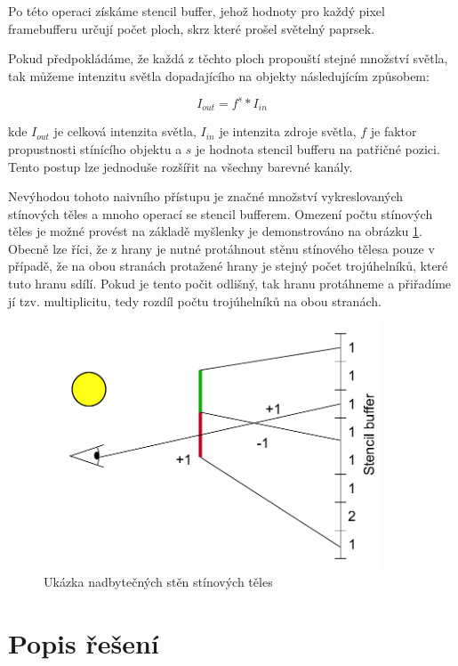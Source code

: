 \documentclass[a4paper, 12pt]{article}
\begin{document}
Po této operaci získáme stencil buffer, jehož hodnoty pro každý pixel framebufferu určují počet ploch, skrz které prošel světelný paprsek.

Pokud předpokládáme, že každá z těchto ploch propouští stejné množství světla, tak můžeme intenzitu světla dopadajícího na objekty následujícím způsobem:

\begin{equation}
	I_{out} = f^s * I_{in}
\end{equation} 

kde $I_{out}$ je celková intenzita světla, $I_{in}$ je intenzita zdroje světla, $f$ je faktor propustnosti stínícího objektu a $s$ je hodnota stencil bufferu na patřičné pozici. Tento postup lze jednoduše rozšířit na všechny barevné kanály.

Nevýhodou tohoto naivního přístupu je značné množství vykreslovaných stínových těles a mnoho operací se stencil bufferem. Omezení počtu stínových těles je možné provést na základě myšlenky je demonstrováno na obrázku \ref{fig:joining-shadow-volumes}. Obecně lze říci, že z hrany je nutné protáhnout stěnu stínového tělesa pouze v případě, že na obou stranách protažené hrany je stejný počet trojúhelníků, které tuto hranu sdílí. Pokud je tento počit odlišný, tak hranu protáhneme a přiřadíme jí tzv. multiplicitu, tedy rozdíl počtu trojúhelníků na obou stranách.

\begin{figure}[H]
	\centering
	\includegraphics[width=10cm,keepaspectratio]{joining-shadow-volumes}
	\caption{Ukázka nadbytečných stěn stínových těles}
	\label{fig:joining-shadow-volumes}
\end{figure}



\section{Popis řešení}
\end{document}

